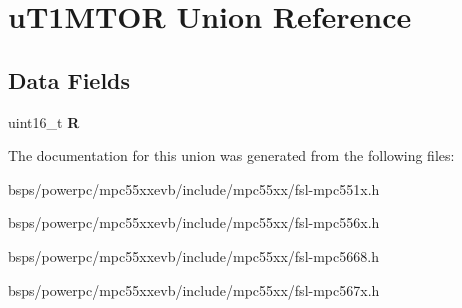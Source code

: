\hypertarget{unionuT1MTOR}{}\section{u\+T1\+M\+T\+OR Union Reference}
\label{unionuT1MTOR}
\subsection*{Data Fields}
\begin{DoxyCompactItemize}
\item 
\mbox{\label{unionuT1MTOR_ada108fc2b0930c2c15729ac1366490d5}} 
uint16\+\_\+t {\bfseries R}
\end{DoxyCompactItemize}


The documentation for this union was generated from the following files\+:\begin{DoxyCompactItemize}
\item 
bsps/powerpc/mpc55xxevb/include/mpc55xx/fsl-\/mpc551x.\+h\item 
bsps/powerpc/mpc55xxevb/include/mpc55xx/fsl-\/mpc556x.\+h\item 
bsps/powerpc/mpc55xxevb/include/mpc55xx/fsl-\/mpc5668.\+h\item 
bsps/powerpc/mpc55xxevb/include/mpc55xx/fsl-\/mpc567x.\+h\end{DoxyCompactItemize}
